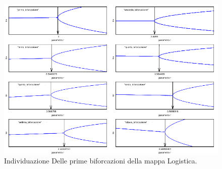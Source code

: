 \documentclass[13pt]{article}
\begin{document}
\begin{figure}
\includegraphics[width=24cm,keepaspectratio]{picture/quadro_1}
\caption{Individuazione Delle prime biforcazioni della mappa Logistica.}
\label{fig:bifo}
\end{figure}
\end{document}

